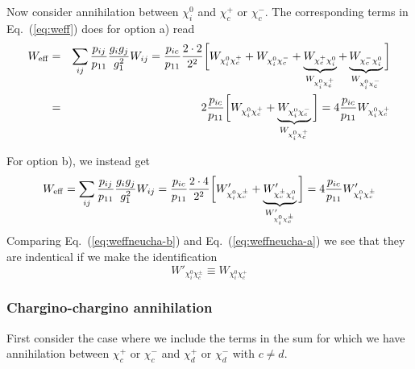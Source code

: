\documentclass[a4paper,10pt,oneside]{book}
\begin{document}
Now consider annihilation between $\chi_{i}^0$ and $\chi_{c}^+$ or 
$\chi_{c}^-$. The corresponding terms in Eq.~(\ref{eq:weff}) does for 
option a) read
\begin{eqnarray}
    W_{\rm eff} & = & \sum_{ij}\frac{p_{ij}}{p_{11}} 
    \frac{g_{i}g_{j}}{g_{1}^2} W_{ij}
    =
    \frac{p_{ic}}{p_{11}} \frac{2 \cdot 2}{2^2}
    \bigg[ 
    W_{\chi_{i}^0 \chi_{c}^+} +
    W_{\chi_{i}^0 \chi_{c}^-} +
    \underbrace{W_{\chi_{c}^+ \chi_{i}^0}}_{W_{\chi_{i}^0 \chi_{c}^+}} +
    \underbrace{W_{\chi_{c}^- \chi_{i}^0}}_{W_{\chi_{i}^0 \chi_{c}^-}}
    \bigg] \nonumber \\
    & = & 2 \frac{p_{ic}}{p_{11}} 
    \bigg[
    W_{\chi_{i}^0 \chi_{c}^+} +
    \underbrace{W_{\chi_{i}^0 \chi_{c}^-}}_{W_{\chi_{i}^0 \chi_{c}^+}}
    \bigg]
    = 4 \frac{p_{ic}}{p_{11}} 
    W_{\chi_{i}^0 \chi_{c}^+}
    \label{eq:weffneucha-a}
\end{eqnarray}

For option b), we instead get
\begin{equation}
    W_{\rm eff} = \sum_{ij}\frac{p_{ij}}{p_{11}} 
    \frac{g_{i}g_{j}}{g_{1}^2} W_{ij}
    =
    \frac{p_{ic}}{p_{11}} \frac{2 \cdot 4}{2^2}
    \bigg[ 
    W'_{\chi_{i}^0 \chi_{c}^\pm} +
    \underbrace{W'_{\chi_{c}^\pm \chi_{i}^0}}_{W'_{\chi_{i}^0 \chi_{c}^\pm}}
    \bigg]
    =
    4 \frac{p_{ic}}{p_{11}} W'_{\chi_{i}^0 \chi_{c}^\pm}
    \label{eq:weffneucha-b}
\end{equation}
Comparing Eq.~(\ref{eq:weffneucha-b}) and Eq.~(\ref{eq:weffneucha-a}) 
we see that they are indentical if we make the identification
\begin{equation}
    W'_{\chi_{i}^0 \chi_{c}^\pm} \equiv W_{\chi_{i}^0 \chi_{c}^+}
\end{equation}

\subsubsection{Chargino-chargino annihilation}

First consider the case where we include the terms in the sum for 
which we have annihilation between $\chi_{c}^+$ or $\chi_{c}^-$ and 
$\chi_{d}^+$ or $\chi_{d}^-$ with $c \ne d$.
\end{document}

